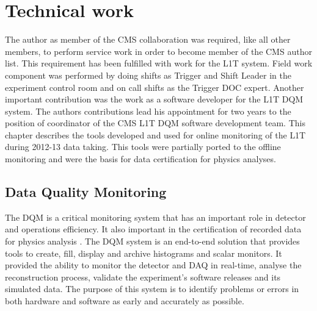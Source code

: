 \chapter{Technical work}
\label{CHAPTER:TechnicalWork}



The author as member of the \gls{CMS} collaboration was required, like all other members, to perform service work in order to become member of the \gls{CMS} author list. This requirement has been fulfilled with work for the \gls{L1T} system. Field work component was performed by doing shifts as Trigger and Shift Leader in the experiment control room and on call shifts as the Trigger \gls{DOC} expert. Another important contribution was the work as a software developer for the \gls{L1T} \gls{DQM} system. The authors contributions lead his appointment for two years to the position of coordinator of the \gls{CMS} \gls{L1T} \gls{DQM} software development team. This chapter describes the tools developed and used for online monitoring of the \gls{L1T} during 2012-13 data taking. This tools were partially ported to the offline monitoring and were the basis for data certification for physics analyses.

\section{Data Quality Monitoring}
\label{SECTION:TechnicalWork_DataQualityMonitoring}


The \acrfull{DQM} is a critical monitoring system that has an important role in detector and operations efficiency. It also important in the certification of recorded data for physics analysis \cite{CMSTDR:CMSTridasTDRVol1,ARTICLE:CMSDataQualityMonitoringSoftWare_ExperienceAndFuture}. The \gls{DQM} system is an end-to-end solution that provides tools to create, fill, display and archive histograms and scalar monitors. It provided the ability to monitor the detector and \gls{DAQ} in real-time, analyse the reconstruction process, validate the experiment's software releases and its simulated data. The purpose of this system is to identify problems or errors in both hardware and software as early and accurately as possible.

